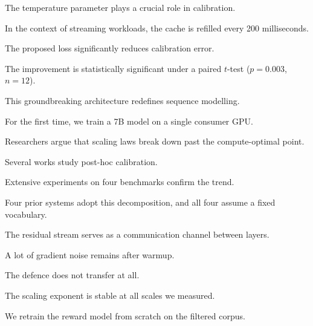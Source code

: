 The temperature parameter plays a crucial role in calibration.

In the context of streaming workloads, the cache is refilled every 200 milliseconds.

The proposed loss significantly reduces calibration error.

The improvement is statistically significant under a paired $t$-test ($p = 0.003$, $n = 12$).

This groundbreaking architecture redefines sequence modelling.

For the first time, we train a 7B model on a single consumer GPU.

Researchers argue that scaling laws break down past the compute-optimal point.

Several works study post-hoc calibration.

Extensive experiments on four benchmarks confirm the trend.

Four prior systems adopt this decomposition, and all four assume a fixed vocabulary.

The residual stream serves as a communication channel between layers.

A lot of gradient noise remains after warmup.

The defence does not transfer at all.

The scaling exponent is stable at all scales we measured.

We retrain the reward model from scratch on the filtered corpus.


